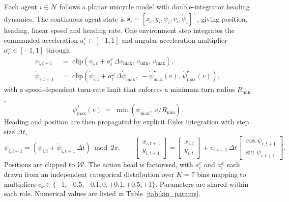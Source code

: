 Each agent $i\in\mathcal{N}$ follows a planar unicycle model with
double-integrator heading dynamics. The continuous agent state is
$\mathbf{s}_i=[x_i,y_i,\psi_i,v_i,\dot{\psi}_i]^{\top}$, giving position,
heading, linear speed and heading rate. One environment step integrates the
commanded acceleration $a_i^{v}\in[-1,1]$ and angular-acceleration multiplier
$a_i^{\omega}\in[-1,1]$ through
\begin{align}
v_{i,t+1} \;&=\; \mathrm{clip}\!\left(v_{i,t} + a_i^{v}\,\Delta v_{\max},\,
    v_{\min},\,v_{\max}\right),
\label{eq:v_update}\\[2pt]
\dot{\psi}_{i,t+1} \;&=\; \mathrm{clip}\!\left(\dot{\psi}_{i,t}
    + a_i^{\omega}\,\Delta\dot{\psi}_{\max},\;
    -\dot{\psi}_{\max}^{\star}(v),\,\dot{\psi}_{\max}^{\star}(v)\right),
\label{eq:omega_update}
\end{align}
with a speed-dependent turn-rate limit that enforces a minimum turn radius
$R_{\min}$,
\begin{equation}
\dot{\psi}_{\max}^{\star}(v) \;=\;
\min\!\left(\dot{\psi}_{\max},\; v / R_{\min}\right).
\label{eq:turn_limit}
\end{equation}
Heading and position are then propagated by explicit Euler integration with
step size $\Delta t$,
\begin{equation}
\psi_{i,t+1} = \left(\psi_{i,t} + \dot{\psi}_{i,t+1}\,\Delta t\right) \bmod 2\pi,
\qquad
\begin{bmatrix} x_{i,t+1}\\ y_{i,t+1}\end{bmatrix}
= \begin{bmatrix} x_{i,t}\\ y_{i,t}\end{bmatrix}
+ v_{i,t+1}\,\Delta t
  \begin{bmatrix}\cos\psi_{i,t+1}\\ \sin\psi_{i,t+1}\end{bmatrix}.
\label{eq:pose_update}
\end{equation}
Positions are clipped to $\mathcal{W}$. The action head is factorised, with
$a_i^{v}$ and $a_i^{\omega}$ each drawn from an independent categorical
distribution over $K=7$ bins mapping to multipliers
$c_k\in\{-1,-0.5,-0.1,0,+0.1,+0.5,+1\}$.
Parameters are shared within each role. Numerical values are listed in
Table~\ref{tab:kin_params}.


